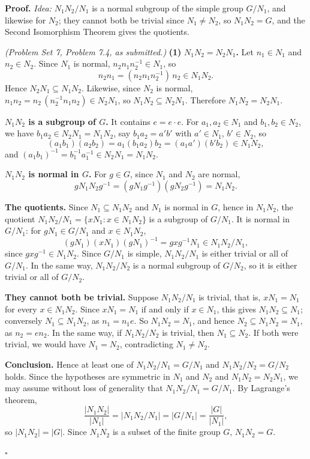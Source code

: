 \documentclass[11pt]{report}
\renewenvironment{proof}[1][Proof]{\noindent\textbf{#1.} }{\hfill$\square$\par\vspace{5pt}}
\begin{document}
\begin{proof}
\textit{Idea:} $N_1N_2/N_1$ is a normal subgroup of the simple group $G/N_1$, and likewise for $N_2$; they cannot both be trivial since $N_1 \neq N_2$, so $N_1N_2 = G$, and the Second Isomorphism Theorem gives the quotients.\par
\textit{(Problem Set 7, Problem 7.4, as submitted.)} \textbf{(1)} \textbf{$N_1N_2 = N_2N_1$.} Let $n_1 \in N_1$ and $n_2 \in N_2$. Since $N_1$ is normal, $n_2n_1n_2^{-1} \in N_1$, so
\[
n_2n_1 = (n_2n_1n_2^{-1})\,n_2 \in N_1N_2.
\]
Hence $N_2N_1 \subseteq N_1N_2$. Likewise, since $N_2$ is normal, $n_1n_2 = n_2\,(n_2^{-1}n_1n_2) \in N_2N_1$, so $N_1N_2 \subseteq N_2N_1$. Therefore $N_1N_2 = N_2N_1$.

\textbf{$N_1N_2$ is a subgroup of $G$.} It contains $e = e \cdot e$. For $a_1, a_2 \in N_1$ and $b_1, b_2 \in N_2$, we have $b_1a_2 \in N_2N_1 = N_1N_2$, say $b_1a_2 = a'b'$ with $a' \in N_1$, $b' \in N_2$, so
\[
(a_1b_1)(a_2b_2) = a_1(b_1a_2)b_2 = (a_1a')(b'b_2) \in N_1N_2,
\]
and $(a_1b_1)^{-1} = b_1^{-1}a_1^{-1} \in N_2N_1 = N_1N_2$.

\textbf{$N_1N_2$ is normal in $G$.} For $g \in G$, since $N_1$ and $N_2$ are normal,
\[
gN_1N_2g^{-1} = (gN_1g^{-1})(gN_2g^{-1}) = N_1N_2.
\]

\textbf{The quotients.} Since $N_1 \subseteq N_1N_2$ and $N_1$ is normal in $G$, hence in $N_1N_2$, the quotient $N_1N_2/N_1 = \{xN_1 : x \in N_1N_2\}$ is a subgroup of $G/N_1$. It is normal in $G/N_1$: for $gN_1 \in G/N_1$ and $x \in N_1N_2$,
\[
(gN_1)(xN_1)(gN_1)^{-1} = gxg^{-1}N_1 \in N_1N_2/N_1,
\]
since $gxg^{-1} \in N_1N_2$. Since $G/N_1$ is simple, $N_1N_2/N_1$ is either trivial or all of $G/N_1$. In the same way, $N_1N_2/N_2$ is a normal subgroup of $G/N_2$, so it is either trivial or all of $G/N_2$.

\textbf{They cannot both be trivial.} Suppose $N_1N_2/N_1$ is trivial, that is, $xN_1 = N_1$ for every $x \in N_1N_2$. Since $xN_1 = N_1$ if and only if $x \in N_1$, this gives $N_1N_2 \subseteq N_1$; conversely $N_1 \subseteq N_1N_2$, as $n_1 = n_1e$. So $N_1N_2 = N_1$, and hence $N_2 \subseteq N_1N_2 = N_1$, as $n_2 = en_2$. In the same way, if $N_1N_2/N_2$ is trivial, then $N_1 \subseteq N_2$. If both were trivial, we would have $N_1 = N_2$, contradicting $N_1 \neq N_2$.

\textbf{Conclusion.} Hence at least one of $N_1N_2/N_1 = G/N_1$ and $N_1N_2/N_2 = G/N_2$ holds. Since the hypotheses are symmetric in $N_1$ and $N_2$ and $N_1N_2 = N_2N_1$, we may assume without loss of generality that $N_1N_2/N_1 = G/N_1$. By Lagrange's theorem,
\[
\frac{|N_1N_2|}{|N_1|} = |N_1N_2/N_1| = |G/N_1| = \frac{|G|}{|N_1|},
\]
so $|N_1N_2| = |G|$. Since $N_1N_2$ is a subset of the finite group $G$, $N_1N_2 = G$.


\end{proof}
\end{document}
